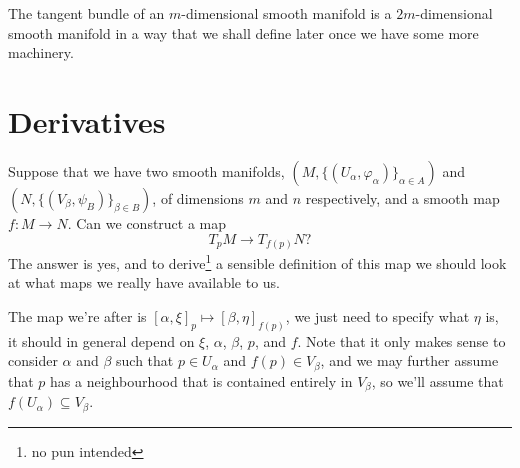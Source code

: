 \documentclass[fleqn]{NotesClass}
\begin{document}
    The tangent bundle of an \(m\)-dimensional smooth manifold is a \(2m\)-dimensional smooth manifold in a way that we shall define later once we have some more machinery.
    
    \section{Derivatives}
    Suppose that we have two smooth manifolds, \((M, \{(U_\alpha, \varphi_\alpha)\}_{\alpha \in A})\) and \((N, \{(V_\beta, \psi_B	)\}_{\beta \in B})\), of dimensions \(m\) and \(n\) respectively, and a smooth map \(f \colon M \to N\).
    Can we construct a map
    \begin{equation}
        T_pM \to T_{f(p)}N?
    \end{equation}
    The answer is yes, and to derive\footnote{no pun intended} a sensible definition of this map we should look at what maps we really have available to us.
    
    The map we're after is \([\alpha, \xi]_p \mapsto [\beta, \eta]_{f(p)}\), we just need to specify what \(\eta\) is, it should in general depend on \(\xi\), \(\alpha\), \(\beta\), \(p\), and \(f\).
    Note that it only makes sense to consider \(\alpha\) and \(\beta\) such that \(p \in U_\alpha\) and \(f(p) \in V_\beta\), and we may further assume that \(p\) has a neighbourhood that is contained entirely in \(V_\beta\), so we'll assume that \(f(U_\alpha) \subseteq V_\beta\).
    
\end{document}

